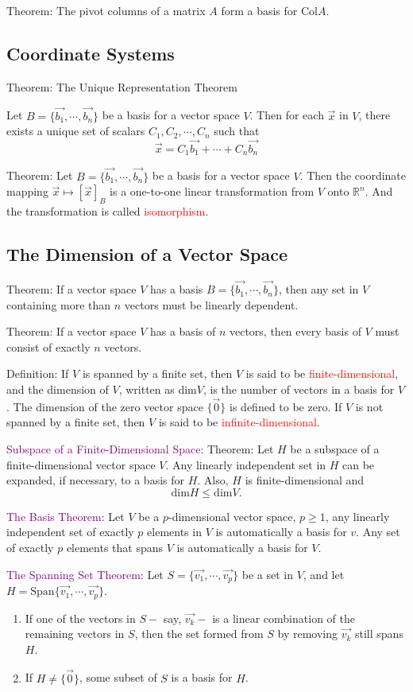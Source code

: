 \documentclass[12pt]{article}
\begin{document}
Theorem: The pivot columns of a matrix $A$ form a basis for Col$A$.

\subsection{Coordinate Systems}
Theorem: The Unique Representation Theorem

Let $B = \{\vec{b_1}, \cdots, \vec{b_n}\}$ be a basis for a vector space $V$. Then for each $\vec{x}$ in $V$, there exists a unique set of scalars $C_1, C_2, \cdots, C_n$ such that $$\vec{x} = C_1\vec{b_1}+\cdots + C_n\vec{b_n}$$

Theorem: Let $B = \{\vec{b_1}, \cdots, \vec{b_n}\}$ be a basis for a vector space $V$. Then the coordinate mapping $\vec{x} \longmapsto [\vec{x}]_B$ is a one-to-one linear transformation from $V$ onto $\mathbb{R}^n$. And the transformation is called \textcolor{red}{isomorphism}.
\subsection{The Dimension of a Vector Space}
Theorem: If a vector space $V$ has a basis $B = \{\vec{b_1}, \cdots, \vec{b_n}\}$, then any set in $V$ containing more than $n$ vectors must be linearly dependent.

Theorem: If a vector space $V$ has a basis of $n$ vectors, then every basis of $V$ must consist of exactly $n$ vectors.

Definition: If $V$ is spanned by a finite set, then $V$ is said to be \textcolor{red}{finite-dimensional}, and the dimension of $V$, written as dim$V$, is the number of vectors in a basis for $V$. The dimension of the zero vector space $\{\vec{0}\}$ is defined to be zero. If $V$ is not spanned by a finite set, then $V$ is said to be \textcolor{red}{infinite-dimensional}.

\textcolor{purple}{Subspace of a Finite-Dimensional Space}:
Theorem: Let $H$ be a subspace of a finite-dimensional vector space $V$. Any linearly independent set in $H$ can be expanded, if necessary, to a basis for $H$. Also, $H$ is finite-dimensional and $$\text{dim}H \leq \text{dim}V.$$

\textcolor{purple}{The Basis Theorem}:
Let $V$ be a $p$-dimensional vector space, $p \geq 1$, any linearly independent set of exactly $p$ elements in $V$ is automatically a basis for $v$. Any set of exactly $p$ elements that spans $V$ is automatically a basis for $V$.

\textcolor{purple}{The Spanning Set Theorem}:
Let $S = \{\vec{v_1}, \cdots, \vec{v_p}\}$ be a set in $V$, and let $H = \text{Span}\{\vec{v_1}, \cdots, \vec{v_p}\}$.
\begin{enumerate}
    \item If one of the vectors in $S - $ say, $\vec{v_k} - $ is a linear combination of the remaining vectors in $S$, then the set formed from $S$ by removing $\vec{v_k}$ still spans $H$.
    \item If $H \neq \{\vec{0}\}$, some subset of $S$ is a basis for $H$.
\end{enumerate}
\end{document}
